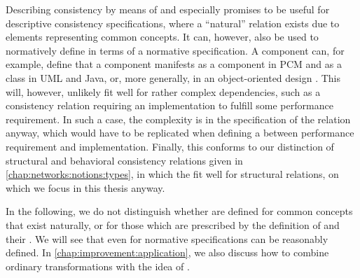 Describing consistency by means of \commonalities and \conceptmetamodels especially promises to be useful for descriptive consistency specifications, where a \enquote{natural} relation exists due to elements representing common concepts.
It can, however, also be used to normatively define \commonalities in terms of a normative specification.
A component \commonality can, for example, define that a component manifests as a component in \gls{PCM} and as a class in \gls{UML} and Java, or, more generally, in an object-oriented design \conceptmetamodel.
This will, however, unlikely fit well for rather complex dependencies, such as a consistency relation requiring an implementation to fulfill some performance requirement.
In such a case, the complexity is in the specification of the relation anyway, which would have to be replicated when defining a \commonality between performance requirement and implementation.
Finally, this conforms to our distinction of structural and behavioral consistency relations given in \autoref{chap:networks:notions:types}, in which the \commonalities fit well for structural relations, on which we focus in this thesis anyway.

In the following, we do not distinguish whether \commonalities are defined for common concepts that exist naturally, or for those which are prescribed by the definition of \conceptmetamodels and their \commonalities.
We will see that even for normative specifications \commonalities can be reasonably defined.
In \autoref{chap:improvement:application}, we also discuss how to combine ordinary transformations with the idea of \conceptmetamodels.





